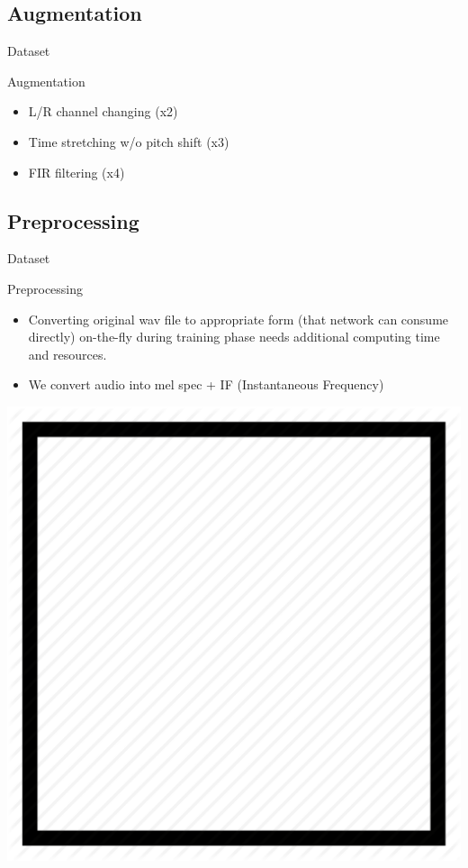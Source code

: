 \subsection{Augmentation}
\begin{frame}{Dataset}
    \begin{block}{Augmentation}
        \begin{itemize}
            \item L/R channel changing (x2)
            \item Time stretching w/o pitch shift (x3)
            \item FIR filtering (x4)
        \end{itemize}
    \end{block}
\end{frame}

\subsection{Preprocessing}
\begin{frame}{Dataset}
    \begin{block}{Preprocessing}
        \begin{itemize}
            \item Converting original wav file to appropriate form (that network can consume directly) on-the-fly during training phase needs additional computing time and resources.
            \item We convert audio into mel spec + IF (Instantaneous Frequency)
        \end{itemize}
        \centering
        \includegraphics[scale=0.1]{assets/figures/square.png}
    \end{block}
\end{frame}